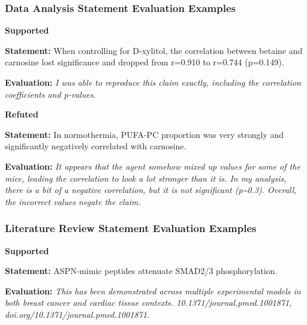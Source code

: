 \documentclass{article}
\begin{document}
\subsubsection*{Data Analysis Statement Evaluation Examples}

\vspace{0.5em}
\noindent\textbf{\large Supported}

\vspace{0.5em}
\noindent\textbf{Statement:} When controlling for D‑xylitol, the correlation between betaine and carnosine lost significance and dropped from r=0.910 to r=0.744 (p=0.149).

\vspace{0.5em}
\noindent\textbf{Evaluation:} \textit{I was able to reproduce this claim exactly, including the correlation coefficients and p-values.}

\vspace{0.5em}
\noindent\textbf{\large Refuted}

\vspace{0.5em}
\noindent\textbf{Statement:} In normothermia, PUFA-PC proportion was very strongly and significantly negatively correlated with carnosine.

\vspace{0.5em}
\noindent\textbf{Evaluation:} \textit{It appears that the agent somehow mixed up values for some of the mice, leading the correlation to look a lot stronger than it is. In my analysis, there is a bit of a negative correlation, but it is not significant (p\textasciitilde{}0.3). Overall, the incorrect values negate the claim.}
\vspace{1em}


\subsubsection*{Literature Review Statement Evaluation Examples}

\vspace{0.5em}
\noindent\textbf{\large Supported}

\vspace{0.5em}
\noindent\textbf{Statement:} ASPN-mimic peptides attenuate SMAD2/3 phosphorylation.

\vspace{0.5em}
\noindent\textbf{Evaluation:} \textit{This has been demonstrated across multiple experimental models in both breast cancer and cardiac tissue contexts.  10.1371/journal.pmed.1001871, doi.org/10.1371/journal.pmed.1001871.}
\end{document}
